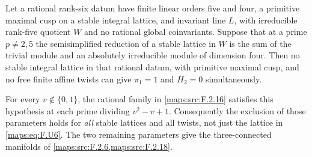 \begin{theorem}\hypertarget{tag-02N8}{}\label{maps:src:F.2.19}


Let a rational rank-six datum have finite linear orders five
and four, a primitive maximal cusp on a stable integral lattice,
and invariant line $L$, with irreducible rank-five quotient $W$
and no rational global coinvariants.  Suppose that at a prime
$p\ne2,5$ the semisimplified reduction of a stable lattice in
$W$ is the sum of the trivial module and an absolutely
irreducible module of dimension four.  Then no stable integral
lattice in that rational datum, with primitive maximal cusp,
and no free finite affine twists can give
$\pi_1=1$ and $H_2=0$ simultaneously.

For every $v\notin\{0,1\}$, the rational family in \ref{maps:src:F.2.16}
satisfies this hypothesis at each prime dividing
$v^2-v+1$.  Consequently the exclusion of those parameters
holds for \emph{all} stable lattices and all twists, not just
the lattice in \eqref{maps:eq:F.U6}.  The two remaining parameters give the three-connected manifolds of \cref{maps:src:F.2.6,maps:src:F.2.18}.

\end{theorem}


